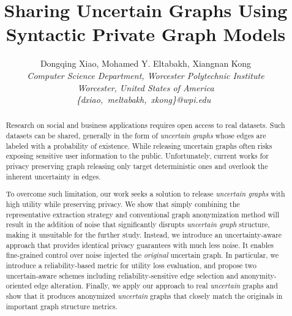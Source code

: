 \documentclass[10pt,conference,letterpaper]{IEEEtran}
\title{Sharing Uncertain Graphs Using Syntactic Private Graph Models}
\author{%
{Dongqing Xiao, Mohamed Y. Eltabakh, Xiangnan Kong}%
\vspace{1.4mm}\\
\fontsize{10}{10}\selectfont\itshape
Computer Science Department, Worcester Polytechnic Institute \\
Worcester, United States of America\\
\fontsize{9}{9}\selectfont\ttfamily\upshape
\{dxiao,~meltabakh,~xkong\}@wpi.edu\
}
\theoremstyle{plain}
\begin{document}
\maketitle


%

\begin{abstract}  
Research on social and business applications requires open access to real datasets. Such datasets can be shared,  generally in the form of \emph{uncertain graphs} whose edges are labeled with a probability of existence. While releasing uncertain graphs often risks exposing sensitive user information to the public. Unfortunately, current works for privacy preserving graph releasing only target deterministic ones and overlook the inherent uncertainty in edges.

To overcome such limitation, our work seeks a solution to release \emph{uncertain graphs} with high utility while preserving privacy. We show that simply combining the representative extraction strategy and conventional graph anonymization method will result in the addition of noise that significantly disrupts \emph{uncertain graph} structure, making it unsuitable for the further study. Instead, we introduce an uncertainty-aware approach that provides identical privacy guarantees with much less noise. It enables fine-grained control over noise injected the \emph{original} uncertain graph. In particular, we introduce a reliability-based metric for utility loss evaluation, and propose two uncertain-aware schemes including reliability-sensitive edge selection and anonymity-oriented edge alteration. Finally, we apply our approach to real \emph{uncertain} graphs and show that it produces anonymized \emph{uncertain} graphs that closely match the originals in important graph structure metrics. 
\end{abstract}









% 

\end{document}
